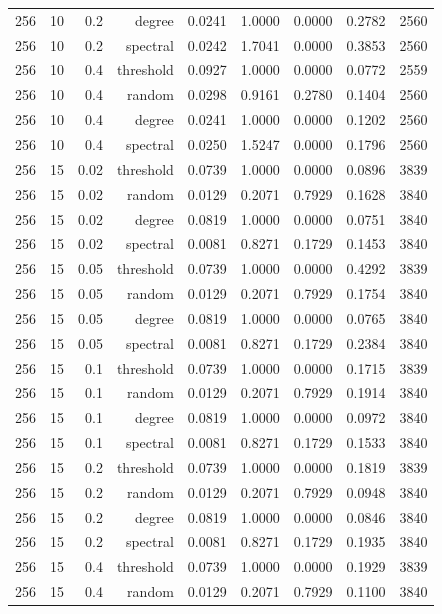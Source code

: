 \begin{table}[t]
\begin{tabular}{lrrrrrrrr}
256 & 10 & 0.2 & degree & 0.0241 & 1.0000 & 0.0000 & 0.2782 & 2560 \\
256 & 10 & 0.2 & spectral & 0.0242 & 1.7041 & 0.0000 & 0.3853 & 2560 \\
256 & 10 & 0.4 & threshold & 0.0927 & 1.0000 & 0.0000 & 0.0772 & 2559 \\
256 & 10 & 0.4 & random & 0.0298 & 0.9161 & 0.2780 & 0.1404 & 2560 \\
256 & 10 & 0.4 & degree & 0.0241 & 1.0000 & 0.0000 & 0.1202 & 2560 \\
256 & 10 & 0.4 & spectral & 0.0250 & 1.5247 & 0.0000 & 0.1796 & 2560 \\
256 & 15 & 0.02 & threshold & 0.0739 & 1.0000 & 0.0000 & 0.0896 & 3839 \\
256 & 15 & 0.02 & random & 0.0129 & 0.2071 & 0.7929 & 0.1628 & 3840 \\
256 & 15 & 0.02 & degree & 0.0819 & 1.0000 & 0.0000 & 0.0751 & 3840 \\
256 & 15 & 0.02 & spectral & 0.0081 & 0.8271 & 0.1729 & 0.1453 & 3840 \\
256 & 15 & 0.05 & threshold & 0.0739 & 1.0000 & 0.0000 & 0.4292 & 3839 \\
256 & 15 & 0.05 & random & 0.0129 & 0.2071 & 0.7929 & 0.1754 & 3840 \\
256 & 15 & 0.05 & degree & 0.0819 & 1.0000 & 0.0000 & 0.0765 & 3840 \\
256 & 15 & 0.05 & spectral & 0.0081 & 0.8271 & 0.1729 & 0.2384 & 3840 \\
256 & 15 & 0.1 & threshold & 0.0739 & 1.0000 & 0.0000 & 0.1715 & 3839 \\
256 & 15 & 0.1 & random & 0.0129 & 0.2071 & 0.7929 & 0.1914 & 3840 \\
256 & 15 & 0.1 & degree & 0.0819 & 1.0000 & 0.0000 & 0.0972 & 3840 \\
256 & 15 & 0.1 & spectral & 0.0081 & 0.8271 & 0.1729 & 0.1533 & 3840 \\
256 & 15 & 0.2 & threshold & 0.0739 & 1.0000 & 0.0000 & 0.1819 & 3839 \\
256 & 15 & 0.2 & random & 0.0129 & 0.2071 & 0.7929 & 0.0948 & 3840 \\
256 & 15 & 0.2 & degree & 0.0819 & 1.0000 & 0.0000 & 0.0846 & 3840 \\
256 & 15 & 0.2 & spectral & 0.0081 & 0.8271 & 0.1729 & 0.1935 & 3840 \\
256 & 15 & 0.4 & threshold & 0.0739 & 1.0000 & 0.0000 & 0.1929 & 3839 \\
256 & 15 & 0.4 & random & 0.0129 & 0.2071 & 0.7929 & 0.1100 & 3840 \\

\end{tabular}
\end{table}
